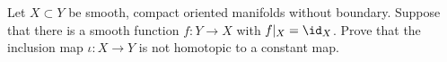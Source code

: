 Let $X\subset Y$ be smooth, compact oriented manifolds without
boundary. Suppose that there is a smooth function $f:Y\rightarrow X$
with $f|_X=\id_X$. Prove that the inclusion map $\iota:X\rightarrow Y$
is not homotopic to a constant map.
